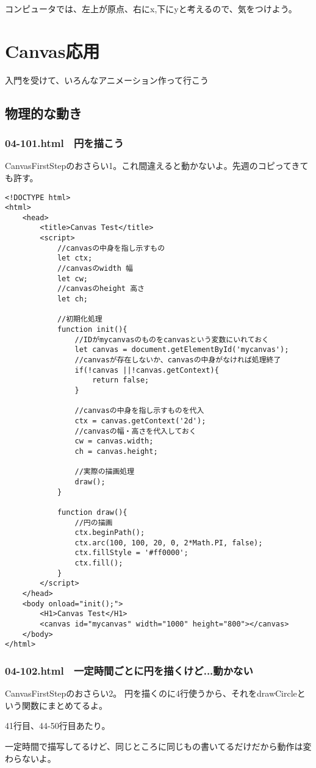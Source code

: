 \documentclass[mingoth,11pt,a4j,uplatex]{jsarticle}
\begin{document}
コンピュータでは、左上が原点、右にx,下にyと考えるので、気をつけよう。


\newpage
\section{Canvas応用}
入門を受けて、いろんなアニメーション作って行こう

\subsection{物理的な動き}
\subsubsection{04-101.html　円を描こう}
CanvasFirstStepのおさらい1。これ間違えると動かないよ。先週のコピってきても許す。
\begin{lstlisting}[caption=円を描こう]
<!DOCTYPE html>
<html>
	<head>
		<title>Canvas Test</title>
		<script>
			//canvasの中身を指し示すもの
			let ctx;
			//canvasのwidth 幅
			let cw;
			//canvasのheight 高さ
			let ch;
			
			//初期化処理
			function init(){
				//IDがmycanvasのものをcanvasという変数にいれておく
				let canvas = document.getElementById('mycanvas');
				//canvasが存在しないか、canvasの中身がなければ処理終了
				if(!canvas ||!canvas.getContext){
					return false;
				}
				
				//canvasの中身を指し示すものを代入
				ctx = canvas.getContext('2d');
				//canvasの幅・高さを代入しておく
				cw = canvas.width;
				ch = canvas.height;
				
				//実際の描画処理
				draw();
			}
			
			function draw(){
				//円の描画
				ctx.beginPath();
				ctx.arc(100, 100, 20, 0, 2*Math.PI, false);
				ctx.fillStyle = '#ff0000';
				ctx.fill();
			}
		</script>
	</head>
	<body onload="init();">
		<H1>Canvas Test</H1>
		<canvas id="mycanvas" width="1000" height="800"></canvas>
	</body>
</html>
\end{lstlisting}

\subsubsection{04-102.html　一定時間ごとに円を描くけど...動かない}
CanvasFirstStepのおさらい2。
円を描くのに4行使うから、それをdrawCircleという関数にまとめてるよ。

41行目、44-50行目あたり。

一定時間で描写してるけど、同じところに同じもの書いてるだけだから動作は変わらないよ。
\end{document}
